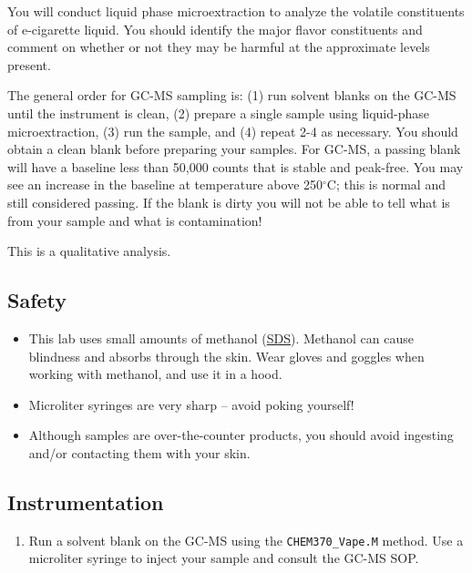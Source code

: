 \documentclass[]{tufte-book}
\providecommand{\tightlist}{%
  \setlength{\itemsep}{0pt}\setlength{\parskip}{0pt}}
\begin{document}
You will conduct liquid phase microextraction to analyze the volatile constituents of e-cigarette liquid. You should identify the major flavor constituents and comment on whether or not they may be harmful at the approximate levels present.

The general order for GC-MS sampling is: (1) run solvent blanks on the GC-MS until the instrument is clean, (2) prepare a single sample using liquid-phase microextraction, (3) run the sample, and (4) repeat 2-4 as necessary. You should obtain a clean blank before preparing your samples. For GC-MS, a passing blank will have a baseline less than 50,000 counts that is stable and peak-free. You may see an increase in the baseline at temperature above 250\(^{\circ}\)C; this is normal and still considered passing. If the blank is dirty you will not be able to tell what is from your sample and what is contamination!

This is a qualitative analysis.

\hypertarget{safety}{%
\subsection*{Safety}\label{safety}}

\begin{itemize}
\tightlist
\item
  This lab uses small amounts of methanol (\href{http://www.sciencelab.com/msds.php?msdsId=9927227}{SDS}). Methanol can cause blindness and absorbs through the skin. Wear gloves and goggles when working with methanol, and use it in a hood.\\
\item
  Microliter syringes are very sharp -- avoid poking yourself!
\item
  Although samples are over-the-counter products, you should avoid ingesting and/or contacting them with your skin.
\end{itemize}

\hypertarget{instrumentation}{%
\subsection{Instrumentation}\label{instrumentation}}

\begin{enumerate}
\def\labelenumi{\arabic{enumi}.}
\tightlist
\item
  Run a solvent blank on the GC-MS using the \texttt{CHEM370\_Vape.M} method. Use a microliter syringe to inject your sample and consult the GC-MS SOP.
\end{enumerate}
\end{document}

